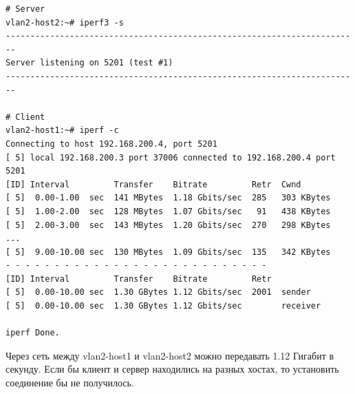 \documentclass{article}
\begin{document}
\begin{lstlisting}
# Server
vlan2-host2:~# iperf3 -s
------------------------------------------------------------------------
Server listening on 5201 (test #1)
------------------------------------------------------------------------

# Client
vlan2-host1:~# iperf -c 
Connecting to host 192.168.200.4, port 5201
[ 5] local 192.168.200.3 port 37006 connected to 192.168.200.4 port 5201
[ID] Interval         Transfer    Bitrate         Retr  Cwnd
[ 5]  0.00-1.00  sec  141 MBytes  1.18 Gbits/sec  285   303 KBytes
[ 5]  1.00-2.00  sec  128 MBytes  1.07 Gbits/sec   91   438 KBytes
[ 5]  2.00-3.00  sec  143 MBytes  1.20 Gbits/sec  270   298 KBytes
...
[ 5]  9.00-10.00 sec  130 MBytes  1.09 Gbits/sec  135   342 KBytes
- - - - - - - - - - - - - - - - - - - - - - - - - - -
[ID] Interval         Transfer    Bitrate         Retr
[ 5]  0.00-10.00 sec  1.30 GBytes 1.12 Gbits/sec  2001  sender
[ 5]  0.00-10.00 sec  1.30 GBytes 1.12 Gbits/sec        receiver

iperf Done.
\end{lstlisting}
Через сеть между vlan2-host1 и vlan2-host2 можно передавать 1.12 Гигабит в секунду. Если бы клиент и сервер находились на разных хостах, то установить соединение бы не получилось.
\end{document}

